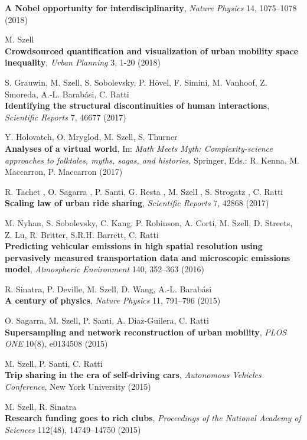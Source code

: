 \documentclass[10pt,a4paper]{article}
\begin{document}
\begin{etaremune}
    \textbf{A Nobel opportunity for interdisciplinarity}, \textit{Nature Physics} 14, 1075--1078 (2018)
\item M. Szell\\
    \textbf{Crowdsourced quantification and visualization of urban mobility space inequality}, \textit{Urban Planning} 3, 1-20 (2018)
\item S. Grauwin, M. Szell, S. Sobolevsky, P. H\"{o}vel, F. Simini, M. Vanhoof, Z. Smoreda, A.-L. Barab\'asi, C. Ratti\\
    \textbf{Identifying the structural discontinuities of human interactions}, \textit{Scientific Reports} 7, 46677 (2017)
\item Y. Holovatch, O. Mryglod, M. Szell, S. Thurner\\
    \textbf{Analyses of a virtual world}, In: \textit{Math Meets Myth: Complexity-science approaches to folktales, myths, sagas, and histories}, Springer, Eds.: R. Kenna, M. Maccarron, P. Maccarron (2017)
\item R. Tachet , O. Sagarra , P. Santi, G. Resta , M. Szell , S. Strogatz , C. Ratti\\
    \textbf{Scaling law of urban ride sharing}, \textit{Scientific Reports} 7, 42868 (2017)
\item M. Nyhan, S. Sobolevsky, C. Kang, P. Robinson, A. Corti, M. Szell, D. Streets, Z. Lu, R. Britter, S.R.H. Barrett, C. Ratti\\
    \textbf{Predicting vehicular emissions in high spatial resolution using pervasively measured transportation data and microscopic emissions model}, \textit{Atmospheric Environment} 140, 352--363 (2016)
\item R. Sinatra, P. Deville, M. Szell, D. Wang, A.-L. Barab\'asi\\
    \textbf{A century of physics}, \textit{Nature Physics} 11, 791--796 (2015)
\item O. Sagarra, M. Szell, P. Santi, A. Diaz-Guilera, C. Ratti\\
    \textbf{Supersampling and network reconstruction of urban mobility}, \textit{PLOS ONE} 10(8), e0134508 (2015)
\item M. Szell, P. Santi, C. Ratti\\
\textbf{Trip sharing in the era of self-driving cars}, \textit{Autonomous Vehicles Conference}, New York University (2015)
\item M. Szell, R. Sinatra\\
    \textbf{Research funding goes to rich clubs}, \textit{Proceedings of the National Academy of Sciences} 112(48), 14749--14750 (2015)  

\end{etaremune}
\end{document}

